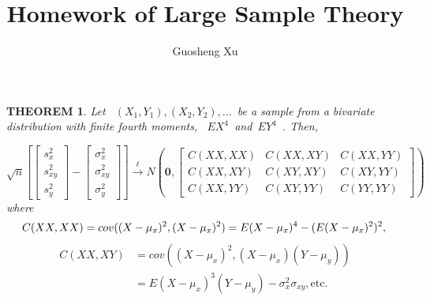 \documentclass{article}
\title{Homework of Large Sample Theory}
\author{Guosheng Xu}
\newtheorem{theorem}{THEOREM}
\begin{document}
\maketitle
\begin{theorem}
Let ~$(X_1,Y_1),(X_2,Y_2),...$~be a sample from a bivariate distribution with finite fourth moments, ~$EX^4$~and~$EY^4$~. Then,


\begin{equation*}
\sqrt{n}\left[
\begin{bmatrix}
s_x^2\\
s_{xy}^2 \\
s_y^2
\end{bmatrix}
-
\begin{bmatrix}
\sigma_x^2 \\
\sigma_{xy}^2 \\
\sigma_y^2  
\end{bmatrix}
\right]
\stackrel{\ell}{\longrightarrow}N\left(\textbf{0},
			\begin{bmatrix}
			C(XX,XX) &C(XX,XY) &C(XX,YY) \\
			C(XX,XY) &C(XY,XY) &C(XY,YY) \\
			C(XX,YY) &C(XY,YY) &C(YY,YY)
			\end{bmatrix}\right)
\end{equation*}
where
\begin{equation*}
C(XX,XX) = cov((X-\mu_x)^2,(X-\mu_x)^2) = E(X-\mu_x)^4 - (E(X-\mu_x)^2)^2, \\
\end{equation*}
\begin{equation*}
\begin{aligned}
C(XX,XY) &= cov((X-\mu_x)^2,(X-\mu_x)(Y-\mu_y)) \\
    	 &= E(X-\mu_x)^3(Y-\mu_y) - \sigma_x^2\sigma_{xy}, \text{etc.}
\end{aligned}
\end{equation*}

\end{theorem}
\end{document}

